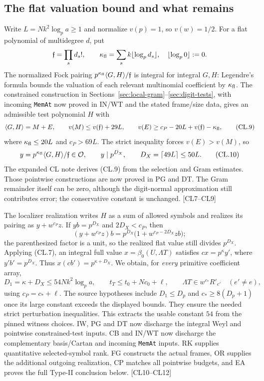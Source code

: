 \documentclass[11pt,a4paper]{article}
\numberwithin{equation}{section}
\theoremstyle{remark}\newtheorem{remark}[theorem]{Remark}
\begin{document}
\subsection{The flat valuation bound and what remains}

Write $L=Nk^2\log_p a\ge1$ and normalize $v(p)=1$, so $v(w)=1/2$. For a flat polynomial of multidegree $d$, put
\[
 \mathfrak f=\prod_s d_s!,\qquad
 \kappa_{\rm fl}=\sum_s k\lfloor\log_p d_s\rfloor,
 \quad \lfloor\log_p0\rfloor:=0.
\]
The normalized Fock pairing $p^{\kappa_{\rm fl}}\langle G,H\rangle/\mathfrak f$ is integral for integral $G,H$: Legendre's formula bounds the valuation of each relevant multinomial coefficient by $\kappa_{\rm fl}$. The constrained construction in Sections~\ref{sec:local-gram}--\ref{sec:digit-tests}, with incoming \texttt{MemAt} now proved in IN/WT and the stated frame/size data, gives an admissible test polynomial $H$ with
\[
 \langle G,H\rangle=M+E,\qquad
 v(M)\le v(\mathfrak f)+29L,\qquad
 v(E)\ge c_P-20L+v(\mathfrak f)-\kappa_{\rm fl},
 \tag{CL.9}\label{eq:cl-flat-error}
\]
where $\kappa_{\rm fl}\le20L$ and $c_P>69L$. The strict inequality forces $v(E)>v(M)$, so
\[
 y=p^{\kappa_{\rm fl}}\langle G,H\rangle/\mathfrak f\in\mathcal O,
 \qquad y\mid p^{D_X},\qquad D_X=\lceil49L\rceil\le50L.
 \tag{CL.10}
\]
The expanded CL note derives (CL.9) from the selection and Gram estimates. Those pointwise constructions are now proved in PG and DT. The Gram remainder itself can be zero, although the digit-normal approximation still contributes error; the conservative constant is unchanged. \textsf{[CL7--CL9]}

The localizer realization writes $H$ as a sum of allowed symbols and realizes its pairing as $y+w^{c_P}z$. If $yb=p^{D_X}$ and $2D_X<c_P$, then
\[
 (y+w^{c_P}z)b=p^{D_X}\bigl(1+w^{c_P-2D_X}zb\bigr);
\]
the parenthesized factor is a unit, so the realized flat value still divides $p^{D_X}$. Applying (CL.7), an integral full value $x=\beta_0(U,\Lambda T)$ satisfies $cx=p^\kappa y'$, where $y'b'=p^{D_X}$. Thus $x(cb')=p^{\kappa+D_X}$. We obtain, for \emph{every} primitive coefficient array,
\[
 D_1=\kappa+D_X\le54Nk^2\log_p a,
 \qquad t_T\le t_0+Nc_0+\ell,
 \qquad \Lambda T\in w^{c_*}R'_{e'}\quad(e'\ne e),
 \tag{CL.11}\label{eq:cl-final}
\]
using $c_P=c_*+\ell$. The source hypotheses include $D_1\le D_p$ and $c_*\ge8(D_p+1)$ once its large constant exceeds the displayed bounds. They ensure the needed strict perturbation inequalities. This extracts the usable constant $54$ from the pinned witness choices. IW, PG and DT now discharge the integral Weyl and pointwise constrained-test inputs. CB and IN/WT now discharge the complementary basis/Cartan and incoming \texttt{MemAt} inputs. RK supplies quantitative selected-symbol rank. FG constructs the actual frames, OR supplies the additional outgoing realization, CP matches all pointwise budgets, and EA proves the full Type-II conclusion below. \textsf{[CL10--CL12]}
\end{document}

